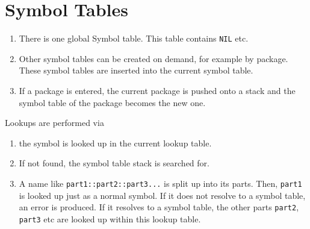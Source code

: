 \documentclass[12pt]{article}
\begin{document}
\section{Symbol Tables}

\begin{enumerate}
\item There is one global Symbol table. This table contains \texttt{NIL} etc.
\item Other symbol tables can be created on demand, for example by package.
These symbol tables are inserted into the current symbol table.
\item If a package is entered, the current package is pushed onto a stack and
the symbol table of the package becomes the new one.
\end{enumerate}

Lookups are performed via

\begin{enumerate}
\item the symbol is looked up in the current lookup table.
\item If not found, the symbol table stack is searched for.
\item A name like \texttt{part1::part2::part3...} is split up into its parts. Then,
\texttt{part1} is looked up just as a normal symbol. If it does not resolve to a symbol
table, an error is produced. If it resolves to a symbol table, the other parts
\texttt{part2}, \texttt{part3} etc are looked up within this lookup table.
\end{enumerate}
\end{document}
